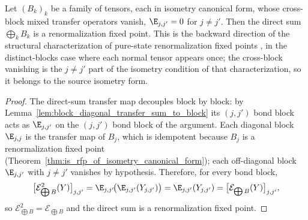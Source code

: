 \begin{theorem}%
    \label{thm:is_rfp_of_isometry_canonical_form_direct_sum}
    \leanok
    Let $(B_k)_k$ be a family of tensors, each in isometry canonical form, whose
    cross-block mixed transfer operators vanish, $\E_{j,j'}=0$ for $j\ne j'$. Then
    the direct sum $\bigoplus_k B_k$ is a renormalization fixed point. This is the
    backward direction of the structural characterization of pure-state
    renormalization fixed points \cite[Section~3]{Cirac2016MPDO_arXiv}, in the
    distinct-blocks case where each normal tensor appears once; the cross-block
    vanishing is the $j\ne j'$ part of the isometry condition of that
    characterization, so it belongs to the source isometry form.
\end{theorem}
\begin{proof}\leanok
    The direct-sum transfer map decouples block by block: by
    Lemma~\ref{lem:block_diagonal_transfer_sum_to_block} its $(j,j')$ bond block
    acts as $\E_{j,j'}$ on the $(j,j')$ bond block of the argument. Each diagonal
    block $\E_{j,j}$ is the transfer map of $B_j$, which is idempotent because
    $B_j$ is a renormalization fixed point
    (Theorem~\ref{thm:is_rfp_of_isometry_canonical_form}); each off-diagonal block
    $\E_{j,j'}$ with $j\ne j'$ vanishes by hypothesis. Therefore, for every bond
    block,
    \[
        \bigl[\mathcal{E}_{\bigoplus B}^2(Y)\bigr]_{j,j'}
        = \E_{j,j'}\!\bigl(\E_{j,j'}(Y_{j,j'})\bigr)
        = \E_{j,j'}(Y_{j,j'})
        = \bigl[\mathcal{E}_{\bigoplus B}(Y)\bigr]_{j,j'},
    \]
    so $\mathcal{E}_{\bigoplus B}^2 = \mathcal{E}_{\bigoplus B}$ and the direct
    sum is a renormalization fixed point.
\end{proof}

